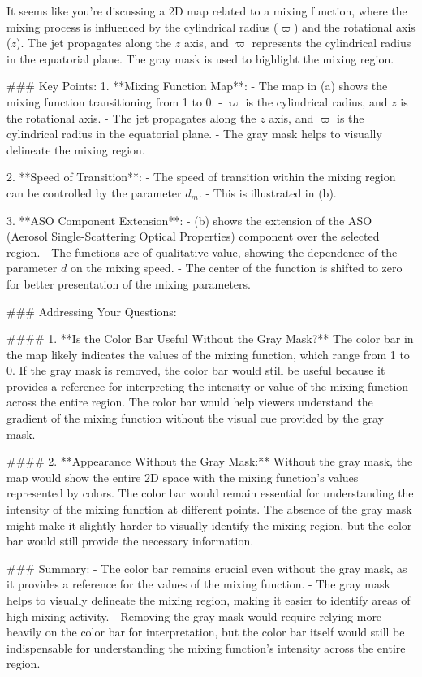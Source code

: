 It seems like you're discussing a 2D map related to a mixing function, where the mixing process is influenced by the cylindrical radius (\(\varpi\)) and the rotational axis (\(z\)). The jet propagates along the \(z\) axis, and \(\varpi\) represents the cylindrical radius in the equatorial plane. The gray mask is used to highlight the mixing region.

### Key Points:
1. **Mixing Function Map**:
   - The map in (a) shows the mixing function transitioning from 1 to 0.
   - \(\varpi\) is the cylindrical radius, and \(z\) is the rotational axis.
   - The jet propagates along the \(z\) axis, and \(\varpi\) is the cylindrical radius in the equatorial plane.
   - The gray mask helps to visually delineate the mixing region.

2. **Speed of Transition**:
   - The speed of transition within the mixing region can be controlled by the parameter \(d_m\).
   - This is illustrated in (b).

3. **ASO Component Extension**:
   - (b) shows the extension of the ASO (Aerosol Single-Scattering Optical Properties) component over the selected region.
   - The functions are of qualitative value, showing the dependence of the parameter \(d\) on the mixing speed.
   - The center of the function is shifted to zero for better presentation of the mixing parameters.

### Addressing Your Questions:

#### 1. **Is the Color Bar Useful Without the Gray Mask?**
The color bar in the map likely indicates the values of the mixing function, which range from 1 to 0. If the gray mask is removed, the color bar would still be useful because it provides a reference for interpreting the intensity or value of the mixing function across the entire region. The color bar would help viewers understand the gradient of the mixing function without the visual cue provided by the gray mask.

#### 2. **Appearance Without the Gray Mask:**
Without the gray mask, the map would show the entire 2D space with the mixing function's values represented by colors. The color bar would remain essential for understanding the intensity of the mixing function at different points. The absence of the gray mask might make it slightly harder to visually identify the mixing region, but the color bar would still provide the necessary information.

### Summary:
- The color bar remains crucial even without the gray mask, as it provides a reference for the values of the mixing function.
- The gray mask helps to visually delineate the mixing region, making it easier to identify areas of high mixing activity.
- Removing the gray mask would require relying more heavily on the color bar for interpretation, but the color bar itself would still be indispensable for understanding the mixing function's intensity across the entire region.